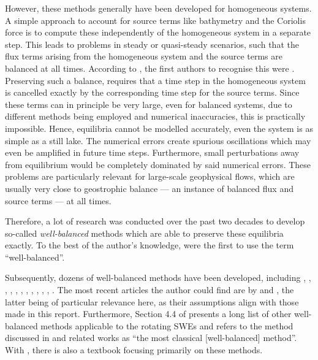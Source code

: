 However, these methods generally have been developed for homogeneous systems. A simple approach to account for source terms like bathymetry and the Coriolis force is to compute these independently of the homogeneous system in a separate step. This leads to problems in steady or quasi-steady scenarios, such that the flux terms arising from the homogeneous system and the source terms are balanced at all times. According to \citet{toro2007godunov}, the first authors to recognise this were \citet{glimm1984generalized}. Preserving such a balance, requires that a time step in the homogeneous system is  cancelled exactly by the corresponding time step for the source terms. Since these terms can in principle be very large, even for balanced systems, due to different methods being employed and numerical inaccuracies, this is practically impossible. Hence, equilibria cannot be modelled accurately, even the system is as simple as a still lake. The numerical errors create spurious oscillations which may even be amplified in future time steps. Furthermore, small perturbations away from equilibrium would be completely dominated by said numerical errors. These problems are particularly relevant for large-scale geophysical flows, which are usually very close to geostrophic balance --- an instance of balanced flux and source terms --- at all times.

Therefore, a lot of research was conducted over the past two decades to develop so-called \emph{well-balanced} methods which are able to preserve these equilibria exactly. To the best of the author's knowledge, \citet{greenberg1996well} were the first to use the term ``well-balanced''.

Subsequently, dozens of well-balanced methods have been developed, including \citet{leveque1998balancing}, \citet{garcia2000numerical}, \citet{hubbard2000flux}, \citet{burguete2001efficient}, \citet{gascon2001construction}, \citet{rogers2001adaptive}, \citet{bale2003wave}, \citet{rogers2003mathematical}, \citet{audusse2004fast}, \citet{chinnayya2004well}, \citet{liang2009adaptive}, \citet{liang2009numerical}. The most recent articles the author could find are by \citet{zhang2014well} and \citet{chertockwell}, the latter being of particular relevance here, as their assumptions align with those made in this report. Furthermore, Section 4.4 of \citet{zeitlin2007nonlinear} presents a long list of other well-balanced methods applicable to the rotating SWEs and refers to the method discussed in \citet{audusse2004fast} and related works as ``the most classical [well-balanced] method''. With \citet{bouchut2004nonlinear}, there is also a textbook focusing primarily on these methods.

